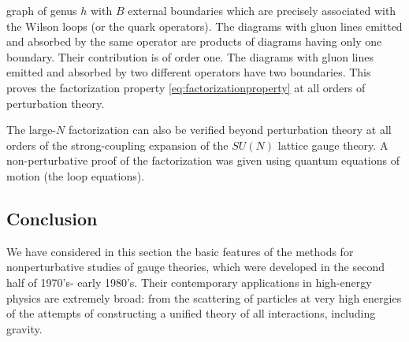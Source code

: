 graph of genus $h$ with $B$ external boundaries which are precisely associated 
with the Wilson loops (or the quark operators). The diagrams with gluon lines
emitted and absorbed by the same operator are products of diagrams having
only one boundary. Their contribution is of order one. The diagrams with gluon
lines emitted and absorbed by two different operators have two boundaries.
This proves the factorization property \eqref{eq:factorizationproperty} at all
orders of perturbation theory.
\par The large-$N$ factorization can also be verified beyond perturbation
theory at all orders  of the strong-coupling expansion of the $SU(N)$ lattice
gauge theory. A non-perturbative proof of the factorization was given using 
quantum equations of motion (the loop equations).
\subsection{Conclusion}
We have considered in this section the basic features of the methods for
nonperturbative studies of gauge theories, which were developed in the
second half of 1970's- early 1980's. Their contemporary applications in
high-energy physics are extremely broad: from the scattering of particles at
very high energies of the attempts of constructing a unified theory of all
interactions, including gravity.

